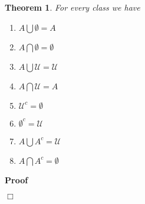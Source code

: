 \documentclass{book}
\newenvironment{proof}{\noindent\textbf{Proof\ }}{\hspace*{\fill}$\Box$\medskip}
\newtheorem{theorem}{Theorem}
\begin{document}
{{\begin{theorem}
  \label{properties of empty set and universal class}For every class we have
  \begin{enumerate}
    \item $A \bigcup \emptyset = A$
    
    \item $A \bigcap \emptyset = \emptyset$
    
    \item $A \bigcup \mathcal{U}=\mathcal{U}$
    
    \item $A \bigcap \mathcal{U}= A$
    
    \item $\mathcal{U}^c = \emptyset$
    
    \item $\emptyset^c =\mathcal{U}$
    
    \item $A \bigcup A^c =\mathcal{U}$
    
    \item $A \bigcap A^c = \emptyset$
  \end{enumerate}
\end{theorem}

\begin{proof}
  

\end{proof}}}
\end{document}
